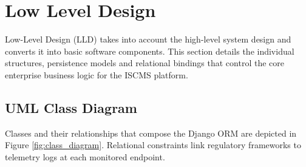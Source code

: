 \section{Low Level Design}
Low-Level Design (LLD) takes into account the high-level system design and converts it into basic software components. This section details the individual structures, persistence models and relational bindings that control the core enterprise business logic for the ISCMS platform.

\subsection{UML Class Diagram}
Classes and their relationships that compose the Django ORM are depicted in Figure \ref{fig:class_diagram}. Relational constraints link regulatory frameworks to telemetry logs at each monitored endpoint.

